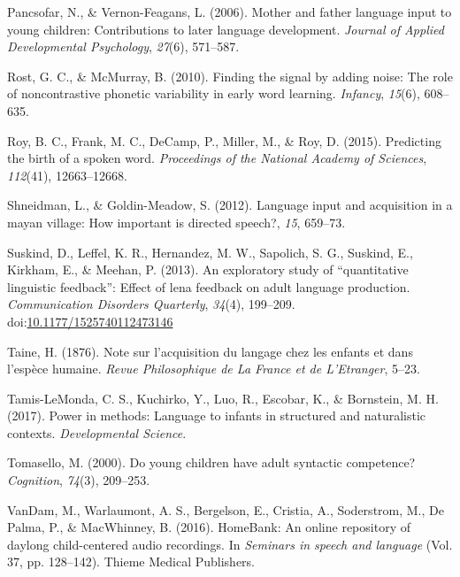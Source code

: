 \documentclass[floatsintext,man]{apa6}
\theoremstyle{definition}
\theoremstyle{definition}
\theoremstyle{definition}
\theoremstyle{remark}
\begin{document}
\leavevmode\hypertarget{ref-pancsofar2006mother}{}%
Pancsofar, N., \& Vernon-Feagans, L. (2006). Mother and father language
input to young children: Contributions to later language development.
\emph{Journal of Applied Developmental Psychology}, \emph{27}(6),
571--587.

\leavevmode\hypertarget{ref-rost2010finding}{}%
Rost, G. C., \& McMurray, B. (2010). Finding the signal by adding noise:
The role of noncontrastive phonetic variability in early word learning.
\emph{Infancy}, \emph{15}(6), 608--635.

\leavevmode\hypertarget{ref-roy2015predicting}{}%
Roy, B. C., Frank, M. C., DeCamp, P., Miller, M., \& Roy, D. (2015).
Predicting the birth of a spoken word. \emph{Proceedings of the National
Academy of Sciences}, \emph{112}(41), 12663--12668.

\leavevmode\hypertarget{ref-shneidman2012language}{}%
Shneidman, L., \& Goldin-Meadow, S. (2012). Language input and
acquisition in a mayan village: How important is directed speech?,
\emph{15}, 659--73.

\leavevmode\hypertarget{ref-suskind2013exploratory}{}%
Suskind, D., Leffel, K. R., Hernandez, M. W., Sapolich, S. G., Suskind,
E., Kirkham, E., \& Meehan, P. (2013). An exploratory study of
``quantitative linguistic feedback'': Effect of lena feedback on adult
language production. \emph{Communication Disorders Quarterly},
\emph{34}(4), 199--209.
doi:\href{https://doi.org/10.1177/1525740112473146}{10.1177/1525740112473146}

\leavevmode\hypertarget{ref-taine1876note}{}%
Taine, H. (1876). Note sur l'acquisition du langage chez les enfants et
dans l'espèce humaine. \emph{Revue Philosophique de La France et de
L'Etranger}, 5--23.

\leavevmode\hypertarget{ref-tamis2017power}{}%
Tamis-LeMonda, C. S., Kuchirko, Y., Luo, R., Escobar, K., \& Bornstein,
M. H. (2017). Power in methods: Language to infants in structured and
naturalistic contexts. \emph{Developmental Science}.

\leavevmode\hypertarget{ref-tomasello2000young}{}%
Tomasello, M. (2000). Do young children have adult syntactic competence?
\emph{Cognition}, \emph{74}(3), 209--253.

\leavevmode\hypertarget{ref-vandam2016homebank}{}%
VanDam, M., Warlaumont, A. S., Bergelson, E., Cristia, A., Soderstrom,
M., De Palma, P., \& MacWhinney, B. (2016). HomeBank: An online
repository of daylong child-centered audio recordings. In \emph{Seminars
in speech and language} (Vol. 37, pp. 128--142). Thieme Medical
Publishers.
\end{document}
